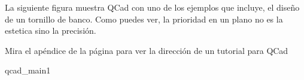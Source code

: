 La siguiente  figura muestra {\sf  QCad} con  uno de los  ejemplos que
incluye,  el diseño  de  un tornillo  de banco.  Como  puedes ver,  la
prioridad en un plano no es la estetica sino la precisión.

Mira el apéndice de la página \pageref{recursos} para ver la dirección
de un tutorial para {\sf QCad}

\begin{figura}{qcad_main}{1}
\caption{QCad con un diseño de ejemplo}
\end{figura}

